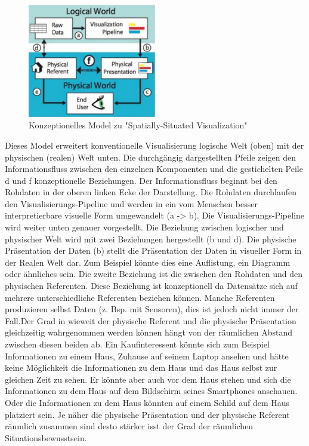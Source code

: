 \begin{figure}[H]
	\centering
	\includegraphics[width=0.5\textwidth]{resources/fundamentals/situated_visualization/spacially_situated_visualization_model.png}
	\caption{Konzeptionelles Model zu "Spatially-Situated Visualization" \cite{example_situated_visualization_concept}}
	\label{img:situated_visualization_concept}
\end{figure}

Dieses Model erweitert konventionelle Visualisierung logische Welt (oben) mit der physischen (realen) Welt unten. Die durchgängig dargestellten Pfeile zeigen den Informationsfluss zwischen den 
einzelnen Komponenten und die gestichelten Peile d und f  konzeptionelle Beziehungen. Der Informationsfluss beginnt bei den Rohdaten in der oberen linken Ecke der Darstellung. Die Rohdaten durchlaufen den 
Visualisierungs-Pipeline und werden in ein vom Menschen besser interpretierbare visuelle Form umgewandelt (a -> b). Die Visualisierungs-Pipeline wird weiter unten genauer vorgestellt. 
Die Beziehung zwischen logischer und physischer Welt wird mit zwei Beziehungen hergestellt (b und d).  Die physische Präsentation der Daten (b) stellt die Präsentation der Daten in visueller Form in der Realen Welt dar. 
Zum Beispiel könnte dies eine Auflistung, ein Diagramm oder ähnliches sein. Die zweite Beziehung ist die zwischen den Rohdaten und den physischen Referenten. Diese Beziehung ist konzeptionell da Datensätze sich auf mehrere unterschiedliche Referenten beziehen können. Manche Referenten produzieren selbst Daten (z. Bsp. mit Sensoren), dies ist jedoch nicht immer der Fall.Der Grad in wieweit der physische Referent und die physische Präsentation gleichzeitig wahrgenommen werden können hängt von der räumlichen Abstand zwischen diesen beiden ab. Ein Kaufinteressent könnte sich zum Beispiel Informationen zu einem Haus, Zuhause auf seinem Laptop ansehen und hätte keine Möglichkeit die Informationen zu dem Haus und das Haus selbst zur gleichen Zeit zu sehen. Er könnte aber auch vor dem Haus stehen und sich die Informationen zu dem Haus auf dem Bildschirm seines Smartphones anschauen. Oder die Informationen zu dem Haus könnten auf einem Schild auf dem Haus platziert sein. Je näher die physische Präsentation und der physische Referent räumlich zusammen sind desto stärker isst der Grad der räumlichen Situationsbewusstsein. 

